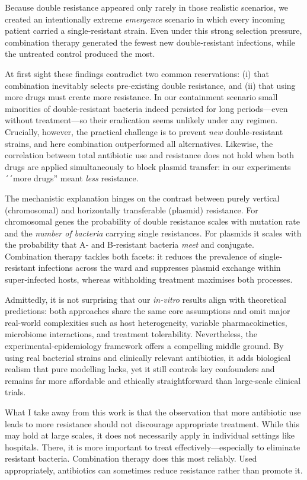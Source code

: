 \documentclass[../main.tex]{subfiles}
\begin{document}
Because double resistance appeared only rarely in those realistic scenarios, we created an intentionally extreme \emph{emergence} scenario in which every incoming patient carried a single‑resistant strain.  Even under this strong selection pressure, combination therapy generated the fewest new double‑resistant infections, while the untreated control produced the most.

At first sight these findings contradict two common reservations: (i) that combination inevitably selects pre‑existing double resistance, and (ii) that using more drugs must create more resistance.  In our containment scenario small minorities of double‑resistant bacteria indeed persisted for long periods—even without treatment—so their eradication seems unlikely under any regimen.  Crucially, however, the practical challenge is to prevent \emph{new} double‑resistant strains, and here combination outperformed all alternatives.  Likewise, the correlation between total antibiotic use and resistance \cite{Gregory2018} does not hold when both drugs are applied simultaneously to block plasmid transfer: in our experiments ´´more drugs'' meant \emph{less} resistance.

The mechanistic explanation hinges on the contrast between purely vertical (chromosomal) and horizontally transferable (plasmid) resistance.  For chromosomal genes the probability of double resistance scales with mutation rate and the \emph{number of bacteria} carrying single resistances.  For plasmids it scales with the probability that A‑ and B‑resistant bacteria \emph{meet} and conjugate.  Combination therapy tackles both facets: it reduces the prevalence of single-resistant infections across the ward and suppresses plasmid exchange within super‑infected hosts, whereas withholding treatment maximises both processes.

Admittedly, it is not surprising that our \textit{in-vitro} results align with theoretical predictions: both approaches share the same core assumptions and omit major real-world complexities such as host heterogeneity, variable pharmacokinetics, microbiome interactions, and treatment tolerability. Nevertheless, the experimental-epidemiology framework offers a compelling middle ground. By using real bacterial strains and clinically relevant antibiotics, it adds biological realism that pure modelling lacks, yet it still controls key confounders and remains far more affordable and ethically straightforward than large-scale clinical trials.

What I take away from this work is that the observation that more antibiotic use leads to more resistance should not discourage appropriate treatment. While this may hold at large scales, it does not necessarily apply in individual settings like hospitals. There, it is more important to treat effectively—especially to eliminate resistant bacteria. Combination therapy does this most reliably. Used appropriately, antibiotics can sometimes reduce resistance rather than promote it.
\end{document}
